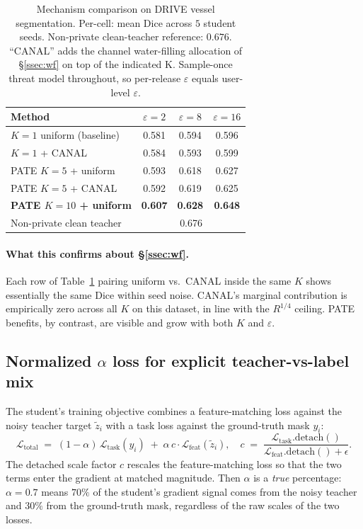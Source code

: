 \begin{table}[t]
\centering
\small
\caption{Mechanism comparison on DRIVE vessel segmentation. Per-cell:
mean Dice across $5$ student seeds. Non-private clean-teacher
reference: $0.676$. ``CANAL'' adds the channel water-filling
allocation of \S\ref{ssec:wf} on top of the indicated K.
Sample-once threat model throughout, so per-release
$\varepsilon$ equals user-level $\varepsilon$.}
\label{tab:mechanism-comp}
\begin{tabular}{l ccc}
\toprule
Method & $\varepsilon = 2$ & $\varepsilon = 8$ & $\varepsilon = 16$ \\
\midrule
$K{=}1$ uniform (baseline)        & 0.581 & 0.594 & 0.596 \\
$K{=}1$ + CANAL                   & 0.584 & 0.593 & 0.599 \\
PATE $K{=}5$ + uniform            & 0.593 & 0.618 & 0.627 \\
PATE $K{=}5$ + CANAL              & 0.592 & 0.619 & 0.625 \\
\textbf{PATE $K{=}10$ + uniform}  & \textbf{0.607} & \textbf{0.628} & \textbf{0.648} \\
\midrule
Non-private clean teacher         & \multicolumn{3}{c}{0.676} \\
\bottomrule
\end{tabular}
\end{table}

\paragraph{What this confirms about \S\ref{ssec:wf}.}
Each row of Table~\ref{tab:mechanism-comp} pairing uniform vs.\ CANAL
inside the same $K$ shows essentially the same Dice within seed
noise. CANAL's marginal contribution is empirically zero across all
$K$ on this dataset, in line with the $R^{1/4}$ ceiling. PATE
benefits, by contrast, are visible and grow with both $K$ and
$\varepsilon$.

\subsection{Normalized $\alpha$ loss for explicit teacher-vs-label mix}
\label{ssec:alpha}

The student's training objective combines a feature-matching loss
against the noisy teacher target $\widetilde{z}_i$ with a task loss
against the ground-truth mask $y_i$:
\begin{equation}
\mathcal{L}_{\mathrm{total}}
 \;=\; (1-\alpha)\,\mathcal{L}_{\mathrm{task}}(y_i)
   \;+\; \alpha\,c\cdot\mathcal{L}_{\mathrm{feat}}(\widetilde{z}_i),
\quad
c \;=\; \frac{\mathcal{L}_{\mathrm{task}}.\mathrm{detach}()}
              {\mathcal{L}_{\mathrm{feat}}.\mathrm{detach}() + \epsilon}.
\label{eq:alpha-loss}
\end{equation}
The detached scale factor $c$ rescales the feature-matching loss so
that the two terms enter the gradient at matched magnitude. Then
$\alpha$ is a \emph{true} percentage: $\alpha = 0.7$ means $70\%$ of
the student's gradient signal comes from the noisy teacher and $30\%$
from the ground-truth mask, regardless of the raw scales of the two
losses.

